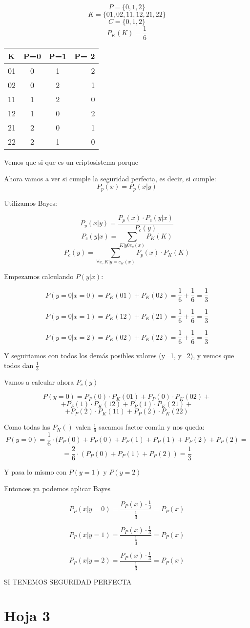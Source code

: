 \begin{problem}[13]
	$$ P = \{0,1,2\}$$
	$$ K = \{ 01, 02 , 11 , 12 , 21 , 22 \}$$
	$$C = \{0,1,2\}$$
	$$P_K(K) = \frac{1}{6}$$
	\begin{center}
		\begin{tabular}{l | c c r}
			 K & P=0 & P=1 & P= 2\\
			 \hline
			 01 & 0 & 1 & 2\\
			 02 & 0 & 2 & 1\\
			 11 & 1 & 2 & 0\\
			 12 & 1 & 0 & 2\\
			 21 & 2 & 0 & 1\\
			 22 & 2 & 1 & 0
		\end{tabular}
	\end{center}
	\solution
	Vemos que si que es un criptosistema porque 
	
	Ahora vamos a ver si cumple la seguridad perfecta, es decir, si cumple:
	$$P_p(x) = P_p(x|y)$$
	
	Utilizamos Bayes:
	
	$$P_p(x|y) = \frac{P_p(x) \cdot P_c(y|x)}{P_c(y)}$$
	$$P_c(y|x) = \sum_{K|y 0 e_k(x)}P_K(K)$$
	$$P_c(y) = \sum_{\forall x, K|y = e_K(x)} P_p(x) \cdot P_K(K)$$
	
	Empezamos calculando $P(y|x)$:
	
	$$P(y=0|x=0) = P_K(01) + P_K(02) = \frac{1}{6} + \frac{1}{6} = \frac{1}{3}$$
	
	$$P(y=0|x=1) = P_K(12) + P_K(21) = \frac{1}{6} + \frac{1}{6} = \frac{1}{3}$$
	
	$$P(y=0|x=2) = P_K(02) + P_K(22) = \frac{1}{6} + \frac{1}{6} = \frac{1}{3}$$
	
	Y seguiriamos con todos los demás posibles valores (y=1, y=2), y vemos que todos dan $\frac{1}{3}$
	
	Vamos a calcular ahora $P_c(y)$
	
	$$P(y=0) = P_P(0)\cdot P_K(01) + P_P(0)\cdot P_K(02) +$$ $$ +P_P(1)\cdot P_K(12) + P_P(1)\cdot P_K(21) +$$ $$+ P_P(2)\cdot P_K(11) + P_P(2)\cdot P_K(22) $$
	
	Como todas las $P_K()$ valen $\frac{1}{6}$ sacamos factor común y nos queda:
	$$P(y=0) = \frac{1}{6}\cdot (P_P(0) + P_P(0) + P_P(1) + P_P(1) + P_P(2) + P_P(2) =$$ $$=\frac{2}{6}\cdot(P_P(0) + P_P(1) + P_P(2)) = \frac{1}{3}$$
	
	Y pasa lo mismo con $P(y=1)$ y $P(y=2)$
	
	Entonces ya podemos aplicar Bayes
	
	$$P_P(x|y=0) = \frac{P_P(x) \cdot \frac{1}{3}}{\frac{1}{3}} = P_P(x)$$
	
	$$P_P(x|y=1) = \frac{P_P(x) \cdot \frac{1}{3}}{\frac{1}{3}} = P_P(x)$$
	
	$$P_P(x|y=2) = \frac{P_P(x) \cdot \frac{1}{3}}{\frac{1}{3}} = P_P(x)$$
	
	SI TENEMOS SEGURIDAD PERFECTA
	
\end{problem}
\section{Hoja 3}